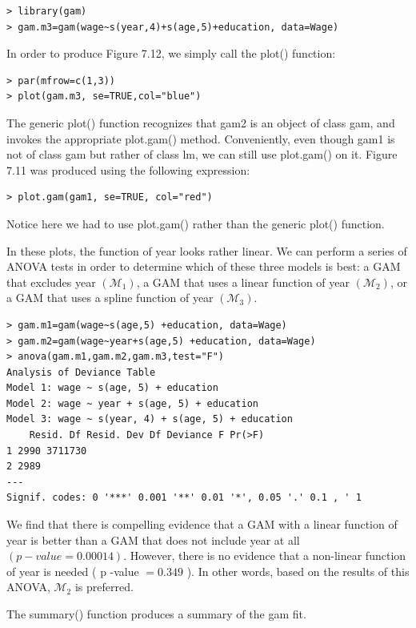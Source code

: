 \documentclass[10pt]{article}
\begin{document}
\begin{verbatim}
> library(gam)
> gam.m3=gam(wage~s(year,4)+s(age,5)+education, data=Wage)
\end{verbatim}

In order to produce Figure 7.12, we simply call the plot() function:

\begin{verbatim}
> par(mfrow=c(1,3))
> plot(gam.m3, se=TRUE,col="blue")
\end{verbatim}

The generic plot() function recognizes that gam2 is an object of class gam, and invokes the appropriate plot.gam() method. Conveniently, even though gam1 is not of class gam but rather of class lm, we can still use plot.gam() on it. Figure 7.11 was produced using the following expression:

\begin{verbatim}
> plot.gam(gam1, se=TRUE, col="red")
\end{verbatim}

Notice here we had to use plot.gam() rather than the generic plot() function.

In these plots, the function of year looks rather linear. We can perform a series of ANOVA tests in order to determine which of these three models is best: a GAM that excludes year $\left(\mathcal{M}_{1}\right)$, a GAM that uses a linear function of year $\left(\mathcal{M}_{2}\right)$, or a GAM that uses a spline function of year $\left(\mathcal{M}_{3}\right)$.

\begin{verbatim}
> gam.m1=gam(wage~s(age,5) +education, data=Wage)
> gam.m2=gam(wage~year+s(age,5) +education, data=Wage)
> anova(gam.m1,gam.m2,gam.m3,test="F")
Analysis of Deviance Table
Model 1: wage ~ s(age, 5) + education
Model 2: wage ~ year + s(age, 5) + education
Model 3: wage ~ s(year, 4) + s(age, 5) + education
    Resid. Df Resid. Dev Df Deviance F Pr(>F)
1 2990 3711730
2 2989
---
Signif. codes: 0 '***' 0.001 '**' 0.01 '*', 0.05 '.' 0.1 , ' 1
\end{verbatim}

We find that there is compelling evidence that a GAM with a linear function of year is better than a GAM that does not include year at all $(p-v a l u e=0.00014)$. However, there is no evidence that a non-linear function of year is needed ( p -value $=0.349$ ). In other words, based on the results of this ANOVA, $\mathcal{M}_{2}$ is preferred.

The summary() function produces a summary of the gam fit.
\end{document}
